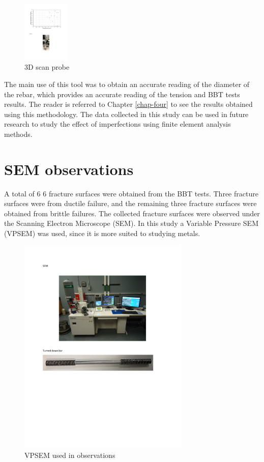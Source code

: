 \begin{figure}[htbp]
    \centering
    \includegraphics[width=0.2\textwidth]{VAC Thesis 2.0/Chapter-3/figs/3d_scanner_01.pdf}
    \caption{3D scan probe}
    \label{fig:3d_scanner_probe}
\end{figure}
The main use of this tool was to obtain an accurate reading of the diameter of the rebar, which provides an accurate reading of the tension and BBT tests results. The reader is referred to Chapter \ref{chap-four} to see the results obtained using this methodology. The data collected in this study can be used in future research to study the effect of imperfections using finite element analysis methods.

\section{SEM observations}

A total of 6 6 fracture surfaces were obtained from the BBT tests. Three fracture surfaces were from ductile failure, and the remaining three fracture surfaces were obtained from brittle failures. The collected fracture surfaces were observed under the Scanning Electron Microscope (SEM). In this study a Variable Pressure SEM (VPSEM) was used, since it is more suited to  studying metals.

\begin{figure}[htbp]
    \centering
    \includegraphics[width=0.725\textwidth]{VAC Thesis 2.0/Chapter-3/figs/SEM_photo.pdf}
    \caption{VPSEM used in observations}
    \label{fig:sem_photo}
\end{figure}

